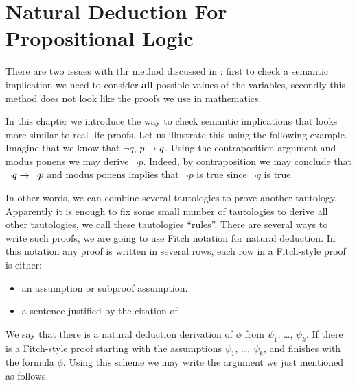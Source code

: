 \chapter{Natural Deduction For Propositional Logic}
\label{chapter:propositional-deduction}

There are two issues with thr method discussed in
: first to check a semantic implication 
we need to consider \textbf{all} possible values of the variables, secondly this
method does not look like the proofs we use in mathematics.

In this chapter we introduce the way to check semantic implications that looks 
more similar to real-life proofs.
Let us illustrate this using the following example. Imagine that we know that
$\lnot q$, $p \rightarrow q$. Using the contraposition argument and modus ponens
we may derive $\lnot p$. Indeed, by contraposition we may conclude that 
$\lnot q \rightarrow \lnot p$ and modus ponens implies that $\lnot p$ is true
since $\lnot q$ is true.

In other words, we can combine several tautologies to prove another tautology.
Apparently it is enough to fix some small number of tautologies to derive all
other tautologies, we call these tautologies ``rules''. There are several ways
to write such proofs, we are going to use Fitch notation for natural deduction.
In this notation any proof is written in several rows, each row in a Fitch-style
proof is either:
\begin{itemize}
  \item an assumption or subproof assumption.
  \item a sentence justified by the citation of
\end{itemize}
We say that there is a natural deduction derivation of $\phi$ from $\psi_1$,
\dots, $\psi_k$. If there is a Fitch-style proof starting with the assumptions
$\psi_1$, \dots, $\psi_k$, and finishes with the formula $\phi$.
Using this scheme we may write the argument we just mentioned as follows.

